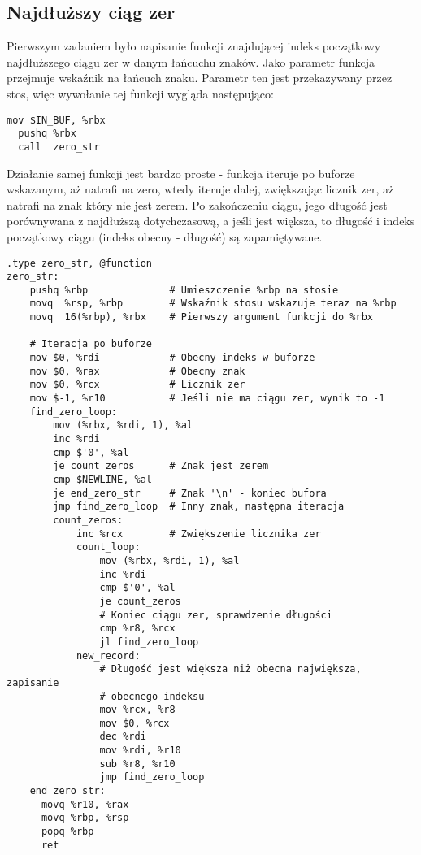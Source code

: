 \documentclass[11pt]{report}
\begin{document}
\subsection{Najdłuższy ciąg zer}
Pierwszym zadaniem było napisanie funkcji znajdującej indeks początkowy najdłuższego ciągu zer w danym łańcuchu znaków. Jako parametr funkcja przejmuje wskaźnik na łańcuch znaku. Parametr ten jest przekazywany przez stos, więc wywołanie tej funkcji wygląda następująco:
\begin{verbatim}
mov $IN_BUF, %rbx
  pushq %rbx
  call  zero_str
\end{verbatim}
Działanie samej funkcji jest bardzo proste - funkcja iteruje po buforze wskazanym, aż natrafi na zero, wtedy iteruje dalej, zwiększając licznik zer, aż natrafi na znak który nie jest zerem. Po zakończeniu ciągu, jego długość jest porównywana z najdłuższą dotychczasową, a jeśli jest większa, to długość i indeks początkowy ciągu (indeks obecny - długość) są zapamiętywane.
\begin{verbatim}
.type zero_str, @function
zero_str:
    pushq %rbp              # Umieszczenie %rbp na stosie
    movq  %rsp, %rbp        # Wskaźnik stosu wskazuje teraz na %rbp
    movq  16(%rbp), %rbx    # Pierwszy argument funkcji do %rbx

    # Iteracja po buforze
    mov $0, %rdi            # Obecny indeks w buforze
    mov $0, %rax            # Obecny znak
    mov $0, %rcx            # Licznik zer
    mov $-1, %r10           # Jeśli nie ma ciągu zer, wynik to -1
    find_zero_loop:
        mov (%rbx, %rdi, 1), %al
        inc %rdi
        cmp $'0', %al       
        je count_zeros      # Znak jest zerem
        cmp $NEWLINE, %al    
        je end_zero_str     # Znak '\n' - koniec bufora
        jmp find_zero_loop  # Inny znak, następna iteracja
        count_zeros:
            inc %rcx        # Zwiększenie licznika zer
            count_loop:           
                mov (%rbx, %rdi, 1), %al
                inc %rdi
                cmp $'0', %al
                je count_zeros
                # Koniec ciągu zer, sprawdzenie długości 
                cmp %r8, %rcx
                jl find_zero_loop
            new_record:
                # Długość jest większa niż obecna największa, zapisanie
                # obecnego indeksu
                mov %rcx, %r8
                mov $0, %rcx
                dec %rdi
                mov %rdi, %r10
                sub %r8, %r10
                jmp find_zero_loop
    end_zero_str:
      movq %r10, %rax
      movq %rbp, %rsp
      popq %rbp
      ret 
\end{verbatim}
\end{document}
